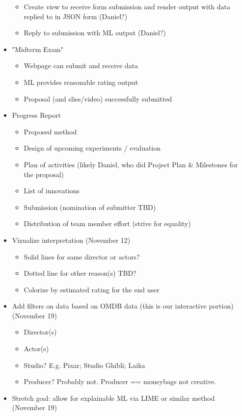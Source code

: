 \begin{itemize}
\begin{itemize}
      \item Create view to receive form submission and render output with data replied to in JSON form (Daniel?)
      \item Reply to submission with ML output (Daniel?)
    \end {itemize}
  \item "Midterm Exam"
    \begin{itemize}
      \item Webpage can submit and receive data
      \item ML provides reasonable rating output
      \item Proposal (and slies/video) successfully submitted
    \end{itemize}
  \item Progress Report
    \begin{itemize}
      \item Proposed method
      \item Design of upcoming experiments / evaluation
      \item Plan of activities (likely Daniel, who did Project Plan \& Milestones for the proposal)
      \item List of innovations
      \item Submission (nomination of submitter TBD)
      \item Distribution of team member effort (strive for equality)
    \end{itemize}
  \item Vizualize interpretation (November 12)
    \begin{itemize}
      \item Solid lines for same director or actors?
      \item Dotted line for other reason(s) TBD?
      \item Colorize by estimated rating for the end user
    \end{itemize}
  \item Add filters on data based on OMDB data (this is our interactive portion) (November 19)
    \begin{itemize}
      \item Director(s)
      \item Actor(s)
      \item Studio? E.g. Pixar; Studio Ghibli; Laika
      \item Producer? Probably not. Producer == moneybags not creative.
    \end{itemize}
  \item Stretch goal: allow for explainable ML via LIME or similar method (November 19)

\end{itemize}
